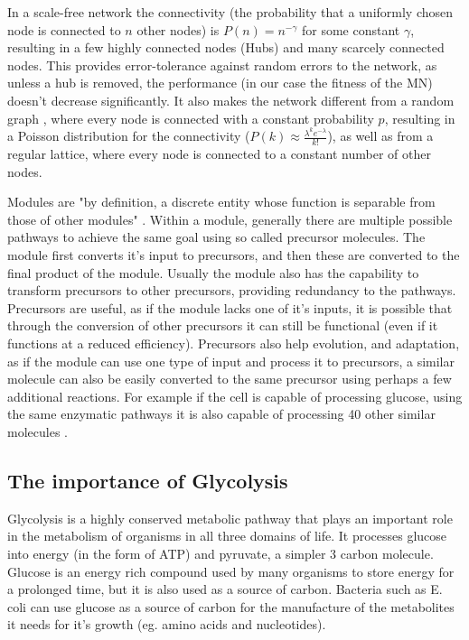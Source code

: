 \documentclass[10pt,a4paper]{article}
\begin{document}
	In a scale-free network the connectivity (the probability that a uniformly chosen node is connected to $n$ other nodes) is $P(n)=n^{-\gamma}$ for some constant $\gamma$, resulting in a few highly connected nodes (Hubs) and many scarcely connected nodes. This provides error-tolerance against random errors to the network, as unless a hub is removed, the performance (in our case the fitness of the MN) doesn't decrease significantly. It also makes the network different from a random graph \cite{randomgraphs}, where every node is connected with a constant probability $p$, resulting in a Poisson distribution for the connectivity ($P(k) \approx \frac{\lambda^k e^{-\lambda}}{k!} $), as well as from a regular lattice, where every node is connected to a constant number of other nodes.
	  
	Modules are "by definition, a discrete entity whose function is separable from those of other modules" \cite{modulardef}. Within a module, generally there are multiple possible pathways to achieve the same goal using so called precursor molecules. The module first converts it's input to precursors, and then these are converted to the final product of the module. Usually the module also has the capability to transform precursors to other precursors, providing redundancy to the pathways. Precursors are useful, as if the module lacks one of it's inputs, it is possible that through the conversion of other precursors it can still be functional (even if it functions at a reduced efficiency). Precursors also help evolution, and adaptation, as if the module can use one type of input and process it to precursors, a similar molecule can also be easily converted to the same precursor using perhaps a few additional reactions. For example if the cell is capable of processing glucose, using the same enzymatic pathways it is also capable of processing 40 other similar molecules \cite{latent}.
	
\subsection{The importance of Glycolysis}
\label{sub:importance_of_glycolysis}

Glycolysis is a highly conserved metabolic pathway that plays an important role in the metabolism of organisms in all three domains of life. It processes glucose into energy (in the form of ATP) and pyruvate, a simpler 3 carbon molecule. Glucose is an energy rich compound used by many organisms to store energy for a prolonged time, but it is also used as a source of carbon. Bacteria such as E. coli can use glucose as a source of carbon for the manufacture of the metabolites it needs for it's growth (eg. amino acids and nucleotides). \cite[]{principlesofbio} 
\end{document}
